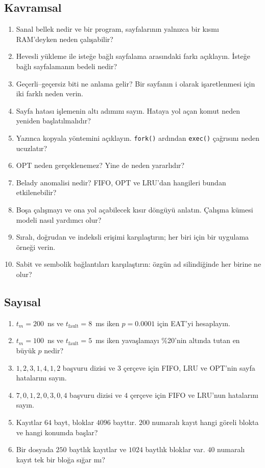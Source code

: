 \documentclass[11pt,a4paper]{article}
\newcommand{\cmd}[1]{\texttt{#1}}
\begin{document}
\subsection*{Kavramsal}
\begin{enumerate}[leftmargin=1.6em]
  \item Sanal bellek nedir ve bir program, sayfalarının yalnızca bir kısmı RAM'deyken neden çalışabilir?
  \item Hevesli yükleme ile isteğe bağlı sayfalama arasındaki farkı açıklayın. İsteğe bağlı sayfalamanın bedeli nedir?
  \item Geçerli--geçersiz biti ne anlama gelir? Bir sayfanın i olarak işaretlenmesi için iki farklı neden verin.
  \item Sayfa hatası işlemenin altı adımını sayın. Hataya yol açan komut neden yeniden başlatılmalıdır?
  \item Yazınca kopyala yöntemini açıklayın. \cmd{fork()} ardından \cmd{exec()} çağrısını neden ucuzlatır?
  \item OPT neden gerçeklenemez? Yine de neden yararlıdır?
  \item Belady anomalisi nedir? FIFO, OPT ve LRU'dan hangileri bundan etkilenebilir?
  \item Boşa çalışmayı ve ona yol açabilecek kısır döngüyü anlatın. Çalışma kümesi modeli nasıl yardımcı olur?
  \item Sıralı, doğrudan ve indeksli erişimi karşılaştırın; her biri için bir uygulama örneği verin.
  \item Sabit ve sembolik bağlantıları karşılaştırın: özgün ad silindiğinde her birine ne olur?
\end{enumerate}

\subsection*{Sayısal}
\begin{enumerate}[leftmargin=1.6em,resume]
  \item $t_m = 200$~ns ve $t_{\text{fault}} = 8$~ms iken $p = 0.0001$ için EAT'yi hesaplayın.
  \item $t_m = 100$~ns ve $t_{\text{fault}} = 5$~ms iken yavaşlamayı \%20'nin altında tutan en büyük $p$ nedir?
  \item $1, 2, 3, 1, 4, 1, 2$ başvuru dizisi ve $3$ çerçeve için FIFO, LRU ve OPT'nin sayfa hatalarını sayın.
  \item $7, 0, 1, 2, 0, 3, 0, 4$ başvuru dizisi ve $4$ çerçeve için FIFO ve LRU'nun hatalarını sayın.
  \item Kayıtlar $64$ bayt, bloklar $4096$ bayttır. $200$ numaralı kayıt hangi göreli blokta ve hangi konumda başlar?
  \item Bir dosyada $250$ baytlık kayıtlar ve $1024$ baytlık bloklar var. $40$ numaralı kayıt tek bir bloğa sığar mı?
\end{enumerate}
\end{document}
